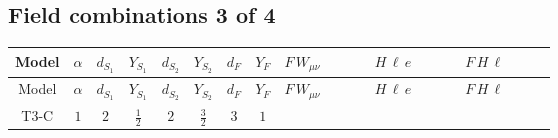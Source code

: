 \documentclass[8pt]{article}
\begin{document}
\begin{landscape}
\subsection*{Field combinations 3 of 4}
\begin{longtable}{@{}cccccccc >{\raggedright\arraybackslash}p{0.21\linewidth} >{\raggedright\arraybackslash}p{0.21\linewidth} >{\raggedright\arraybackslash}p{0.21\linewidth}@{}}
\toprule
Model & $\alpha$ & $d_{S_1}$ & $Y_{S_1}$ & $d_{S_2}$ & $Y_{S_2}$ & $d_F$ & $Y_F$ & $F\,W_{\mu\nu}$ & $H\,\ell\,e$ & $F\,H\,\ell$ \\
\midrule
\endfirsthead
\toprule
Model & $\alpha$ & $d_{S_1}$ & $Y_{S_1}$ & $d_{S_2}$ & $Y_{S_2}$ & $d_F$ & $Y_F$ & $F\,W_{\mu\nu}$ & $H\,\ell\,e$ & $F\,H\,\ell$ \\
\midrule
\endhead
T3-C & $1$ & $2$ & $\frac{1}{2}$ & $2$ & $\frac{3}{2}$ & $3$ & $1$ & \scriptsize\adjustbox{max width=\linewidth}{$\begin{gathered} -2 \hbar  \log \left(\frac{\bar{\mu}^{2}}{M_F^2}\right) \left(W_{\mu _1\mu _2}^{A_1}\right){}^2\end{gathered}$} & \scriptsize\adjustbox{max width=\linewidth}{$\begin{gathered} +\frac{\sqrt{3} \hbar  \overline{y_{1,i_3,r_1}} \overline{L_{a_1,i_2}}\, P_R\, e_{i_1} H_{a_1} y_{1,i_2,r_1} Y_{e,i_3,i_1}}{4 \epsilon } \\ -\frac{1}{8} \sqrt{3} \hbar  \overline{y_{1,i_3,r_1}} \overline{L_{a_1,i_2}}\, P_R\, e_{i_1} H_{a_1} y_{1,i_2,r_1} Y_{e,i_3,i_1} \\ +\frac{\sqrt{3} \hbar  \overline{y_{2,i_3,r_1}} \overline{L_{a_1,i_2}}\, P_R\, e_{i_1} H_{a_1} y_{2,i_2,r_1} Y_{e,i_3,i_1}}{4 \epsilon }\end{gathered}$} & \scriptsize\adjustbox{max width=\linewidth}{$\begin{gathered} -\frac{2 \hbar  \log \left(\frac{M_F^2}{m_2^2}\right) \overline{y_{1,i_1,r_1}} \overline{y_{2,i_2,r_1}} L_{a_4,i_2}{}^T\, C\, P_L\, L_{a_2,i_1} H_{a_1} H_{a_3} m_2^2 \lambda_5 \epsilon_{a_1,a_2} \epsilon_{a_3,a_4} M_F^3}{3 \left(M_F^2-m_1^2\right) \left(M_F^2-m_2^2\right) \left(m_1^2-m_2^2\right)} \\ +\frac{2 \hbar  \log \left(\frac{M_F^2}{m_1^2}\right) \overline{y_{1,i_1,r_1}} \overline{y_{2,i_2,r_1}} L_{a_4,i_2}{}^T\, C\, P_L\, L_{a_2,i_1} H_{a_1} H_{a_3} m_1^2 \lambda_5 \epsilon_{a_1,a_2} \epsilon_{a_3,a_4} M_F^3}{3 \left(M_F^2-m_1^2\right) \left(M_F^2-m_2^2\right) \left(m_1^2-m_2^2\right)} \\ -\frac{2 \hbar  \log \left(\frac{M_F^2}{m_2^2}\right) \overline{\lambda_5} \overline{L_{a_3,i_1}}\, C\, P_R\, \overline{L_{a_4,i_2}}{}^T m_2^2 y_{1,i_1,r_1} y_{2,i_2,r_1} \epsilon_{a_1,a_3} \epsilon_{a_2,a_4} H_{a_1}{}^{\dagger } H_{a_2}{}^{\dagger } M_F^3}{3 \left(M_F^2-m_1^2\right) \left(M_F^2-m_2^2\right) \left(m_1^2-m_2^2\right)}\end{gathered}$} \\

\end{longtable}
\end{landscape}
\end{document}
